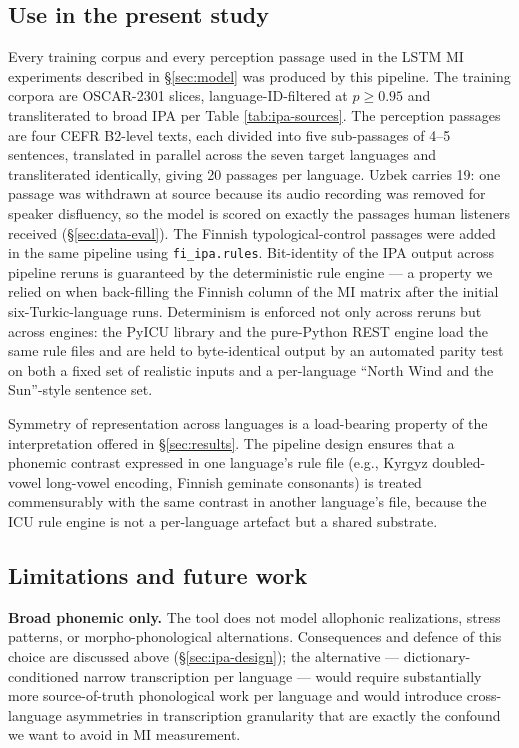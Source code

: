 \subsection{Use in the present study}
\label{sec:ipa-use}

Every training corpus and every perception passage used in the LSTM MI experiments described in \S\ref{sec:model} was produced by this pipeline. The training corpora are OSCAR-2301 slices, language-ID-filtered at $p \geq 0.95$ and transliterated to broad IPA per Table \ref{tab:ipa-sources}. The perception passages are four CEFR B2-level texts, each divided into five sub-passages of 4--5 sentences, translated in parallel across the seven target languages and transliterated identically, giving 20 passages per language. Uzbek carries 19: one passage was withdrawn at source because its audio recording was removed for speaker disfluency, so the model is scored on exactly the passages human listeners received (\S\ref{sec:data-eval}). The Finnish typological-control passages were added in the same pipeline using \texttt{fi\_ipa.rules}. Bit-identity of the IPA output across pipeline reruns is guaranteed by the deterministic rule engine — a property we relied on when back-filling the Finnish column of the MI matrix after the initial six-Turkic-language runs. Determinism is enforced not only across reruns but across engines: the PyICU library and the pure-Python REST engine load the same rule files and are held to byte-identical output by an automated parity test on both a fixed set of realistic inputs and a per-language ``North Wind and the Sun''-style sentence set.

Symmetry of representation across languages is a load-bearing property of the interpretation offered in \S\ref{sec:results}. The pipeline design ensures that a phonemic contrast expressed in one language's rule file (e.g., Kyrgyz doubled-vowel long-vowel encoding, Finnish geminate consonants) is treated commensurably with the same contrast in another language's file, because the ICU rule engine is not a per-language artefact but a shared substrate.

\subsection{Limitations and future work}
\label{sec:ipa-limits}

\textbf{Broad phonemic only.} The tool does not model allophonic realizations, stress patterns, or morpho-phonological alternations. Consequences and defence of this choice are discussed above (\S\ref{sec:ipa-design}); the alternative — dictionary-conditioned narrow transcription per language — would require substantially more source-of-truth phonological work per language and would introduce cross-language asymmetries in transcription granularity that are exactly the confound we want to avoid in MI measurement.

